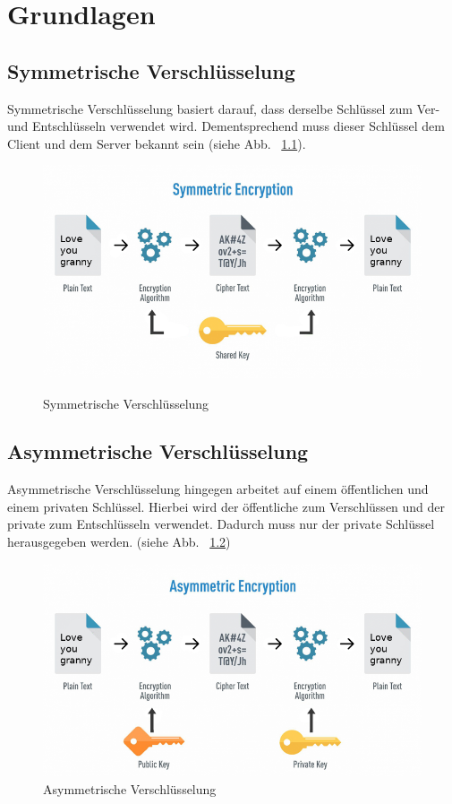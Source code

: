 \chapter{Grundlagen}
\section{Symmetrische Verschlüsselung}

Symmetrische Verschlüsselung basiert darauf, dass derselbe Schlüssel zum Ver- und Entschlüsseln verwendet wird.
Dementsprechend muss dieser Schlüssel dem Client und dem Server bekannt sein (siehe Abb. ~\ref{fig:symetric-crypto}).
  \begin{figure}[!htb]
    \center\includegraphics[scale=0.28]{images/symetric-crypto.png}
    \label{fig:symetric-crypto}
    \caption{Symmetrische Verschlüsselung}
  \end{figure}
    
\section{Asymmetrische Verschlüsselung}

Asymmetrische Verschlüsselung hingegen arbeitet auf einem öffentlichen und einem privaten Schlüssel. 
Hierbei wird der öffentliche zum Verschlüssen und der private zum Entschlüsseln verwendet.
Dadurch muss nur der private Schlüssel herausgegeben werden. (siehe Abb. ~\ref{fig:asymetric-crypto})
  \begin{figure}[!htb]
    \center\includegraphics[scale=0.28]{images/asymetric-crypto.png}
    \caption{Asymmetrische Verschlüsselung}
    \label{fig:asymetric-crypto}
  \end{figure}

